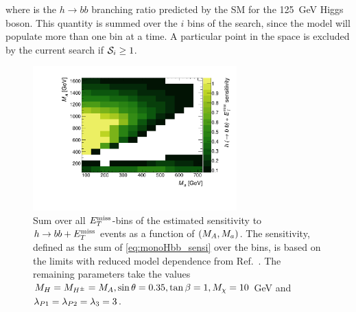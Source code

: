 where  is the $h\to bb$ branching ratio predicted by the SM for the 125~GeV Higgs boson. This quantity is summed over the $i$ \met bins of the search, since the model will populate more than one \met bin at a time. A particular point in the space is excluded by the current search if $\mathcal{S}_i \geq 1$. 

\begin{figure}[tbp]
\centering
\includegraphics[width=0.7\textwidth]{texinputs/04_grid/figures/monoHbb_sensi_sum_bins_1_2_3_4_ma_vs_mA_lin.pdf}
\caption[Sensitivity to $h\to bb + \MET$ signals in $\mA$ - $\ma$ plane, summed across $\MET$ bins]
{
Sum over all $\MET$-bins of the estimated sensitivity to $h\to bb + \MET$ events as a function of $(M_{A},M_{a})$. 
The sensitivity, defined as the sum of \autoref{eq:monoHbb_sensi} over the \met bins, is based on the limits with reduced model dependence from Ref.~\cite{Aaboud:2017yqz}. 
The remaining parameters take the values $ M_{H}=M_{H^{\pm}}= M_{A}, \sin\theta = 0.35, \tan\beta = 1, M_{\chi} = 10$ GeV and $ \lambda_{P1} = \lambda_{P2} = \lambda_{3} = 3 $.}
\label{fig:monoHbb_sensi_full_mA_ma}
\end{figure}

